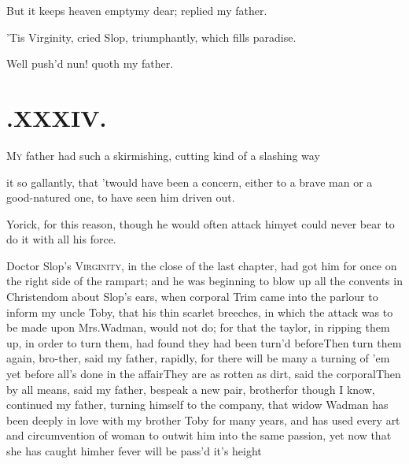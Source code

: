 \documentclass{article}
\begin{document}
But it keeps heaven empty\tsk my dear; replied my father.
\egroup

\etp{}
\eject
\tsk ’Tis Virginity, cried Slop,
triumphantly, which fills paradise.

Well push’d nun! quoth my father.

\section{.\enspace XXXIV.}

\lettrine{M}{y} father had such a skirmishing, cutting kind of a slashing way 

\noindent
{}
 it so gallantly,
that ’twould have been a concern, either to a brave man or
a\break
good-natured one, to have seen him\break
driven out.

Yorick, for this reason, though he would often attack
him\tsk yet could never bear to do it with all his force.

Doctor Slop’s \textsc{Virginity}, in the
close of the last chapter, had got him for once on the right side
of the rampart; and he was beginning to blow up all the convents in
Christendom about Slop’s ears, when corporal
Trim came into the parlour to inform my uncle Toby,
that his thin scarlet breeches, in which the attack was to be made
upon Mrs.\@ Wadman, would not do; for that the taylor, in
ripping them up, in order to turn them, had found they had been
turn’d before\tsh Then turn them again, bro-\break ther,
said my father, rapidly, for there will be many a turning of
’em yet before all’s done in the
affair\tsh They are as rotten as dirt, said the
corporal\tsh\break Then by all means, said my father, bespeak a
new pair, brother\tsh for though I know, continued my
father, turning himself to the company, that widow Wadman
has been deeply in love with my brother Toby for many years,
and has used every art and circumvention of woman to outwit him
into the same passion, yet now that she has caught
him\tsh her fever will be pass’d it’s\break
height\tsh
\end{document}
